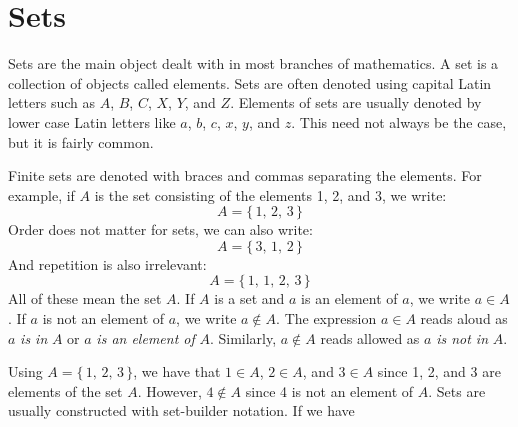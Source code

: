 \documentclass{article}
\theoremstyle{plain}
\theoremstyle{normal}
\newenvironment{example}{%
    \pushQED{\qed}\renewcommand{\qedsymbol}{$\blacksquare$}\examplex%
}{%
    \popQED\endexamplex%
}
\newenvironment{definition}{%
    \pushQED{\qed}\renewcommand{\qedsymbol}{$\blacksquare$}\definitionx%
}{%
    \popQED\enddefinitionx%
}
\newenvironment{notation}{%
    \pushQED{\qed}\renewcommand{\qedsymbol}{$\blacksquare$}\notationx%
}{%
    \popQED\endnotationx%
}
\begin{document}
    \section{Sets}
        Sets are the main object dealt with in most branches of mathematics.
        \begin{definition}[\textbf{Set}]
            A set is a collection of objects called elements.
        \end{definition}
        Sets are often denoted using capital Latin letters such as
        $A$, $B$, $C$, $X$, $Y$, and $Z$. Elements of sets are usually denoted
        by lower case Latin letters like $a$, $b$, $c$, $x$, $y$, and $z$. This
        need not always be the case, but it is fairly common.
        \begin{example}
            Finite sets are denoted with braces and commas separating the
            elements. For example, if $A$ is the set consisting of the elements
            1, 2, and 3, we write:
            \begin{equation}
                A=\{\,1,\,2,\,3\,\}
            \end{equation}
            Order does not matter for sets, we can also write:
            \begin{equation}
                A=\{\,3,\,1,\,2\,\}
            \end{equation}
            And repetition is also irrelevant:
            \begin{equation}
                A=\{\,1,\,1,\,2,\,3\,\}
            \end{equation}
            All of these mean the set $A$.
        \end{example}
        \begin{notation}[\textbf{Containment}]
            If $A$ is a set and $a$ is an element of $a$, we write
            $a\in{A}$. If $a$ is not an element of $a$, we write
            $a\notin{A}$.
        \end{notation}
        The expression $a\in{A}$ reads aloud as
        $a$ \textit{is in} $A$ or $a$ \textit{is an element of} $A$. Similarly,
        $a\notin{A}$ reads allowed as $a$ \textit{is not in} $A$.
        \begin{example}
            Using $A=\{\,1,\,2,\,3\,\}$, we have that
            $1\in{A}$, $2\in{A}$, and $3\in{A}$ since 1, 2, and 3 are elements
            of the set $A$. However, $4\notin{A}$ since 4 is not an element of
            $A$.
        \end{example}
        Sets are usually constructed with set-builder notation. If we have
\end{document}
